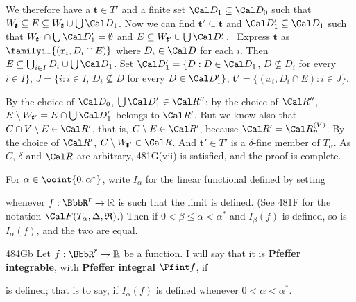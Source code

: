 {\medskip

 We therefore have a $\pmb{t}\in T'$ and a
finite set $\Cal D_1\subseteq\Cal D_0$ such that
$W_{\pmb{t}}\subseteq E\subseteq W_{\pmb{t}}\cup\bigcup\Cal D_1$.
Now we can find $\pmb{t}'\subseteq\pmb{t}$ and
$\Cal D'_1\subseteq\Cal D_1$ such that
$W_{\pmb{t}'}\cap\bigcup\Cal D'_1=\emptyset$ and
$E\subseteq W_{\pmb{t}'}\cup\bigcup\Cal D'_1$.
\Prf\ Express $\pmb{t}$ as $\familyiI{(x_i,D_i\cap E)}$ where
$D_i\in\Cal D$ for each $i$.   Then
$E\subseteq\bigcup_{i\in I}D_i\cup\bigcup\Cal D_1$.   Set
$\Cal D_1'=\{D:D\in\Cal D_1$, $D\not\subseteq D_i$ for every $i\in I\}$,
$J=\{i:i\in I$, $D_i\not\subseteq D$ for every $D\in\Cal D'_1\}$,
$\pmb{t}'=\{(x_i,D_i\cap E):i\in J\}$.\ \Qed

By the choice of $\Cal D_0$, $\bigcup\Cal D'_1\in\Cal R''$;  by the
choice of $\Cal R''$,
$E\setminus W_{\pmb{t}'}=E\cap\bigcup\Cal D'_1$ belongs to $\Cal R'$.
But we know also that $C\cap V\setminus E\in\Cal R'$, that is,
$C\setminus E\in\Cal R'$, because $\Cal R'=\Cal R^{(V)}_{\eta}$.   By
the choice of $\Cal R'$, $C\setminus W_{\pmb{t}'}\in\Cal R$.   And
$\pmb{t}'\in T'$ is a $\delta$-fine member of $T_{\alpha}$.   As $C$,
$\delta$ and $\Cal R$ are
arbitrary, 481G(vii) is satisfied, and the proof is complete.
}%

 For
$\alpha\in\ooint{0,\alpha^*}$, write $I_{\alpha}$ for the linear
functional defined by setting


\noindent whenever $f:\BbbR^r\to\Bbb R$ is such that the limit is
defined.   (See 481F for the notation $\Cal F(T_{\alpha},\Delta,\frak R)$.)
Then if $0<\beta\le\alpha<\alpha^*$ and $I_{\beta}(f)$ is defined, so
is $I_{\alpha}(f)$, and the
two are equal.   

\spheader 484Gb Let $f:\BbbR^r\to\Bbb R$ be a function.   I will say
that it
is {\bf Pfeffer integrable}, with {\bf Pfeffer integral} $\Pfint f$, if


\noindent is defined;  that is to say, if $I_{\alpha}(f)$ is
defined whenever $0<\alpha<\alpha^*$.

